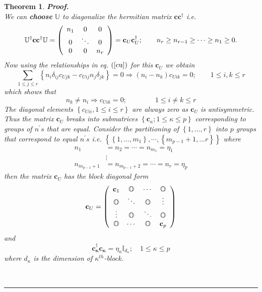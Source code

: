 \documentclass[aps,preprint]{revtex4}%
\newtheorem{theorem}{Theorem}
\newenvironment{proof}[1][Proof]{\noindent\textbf{#1.} }{\ \rule{0.5em}{0.5em}}
\begin{document}
\begin{theorem}
\begin{proof}
\begin{equation}
\end{equation}
We can \textbf{choose} $\mathbb{U}$ to diagonalize the hermitian matrix
$\mathbf{cc}^{\dagger}$ i.e.%
\begin{equation}
\mathbb{U}^{\dagger}\mathbf{cc}\mathbb{^{\dagger}U}=\left(
\begin{array}
[c]{ccc}%
n_{1} & 0 & 0\\
0 & \ddots & 0\\
0 & 0 & n_{r}%
\end{array}
\right)  =\mathbf{c}_{U}\mathbf{c}_{U}^{\dagger};\qquad n_{r}\geq n_{r-1}%
\geq\cdots\geq n_{1}\geq0.
\end{equation}
Now using the relationships in eq. $\left(  \ref{cu}\right)  $ for this
$\mathbf{c}_{U}$ we obtain%
\begin{equation}
\sum_{1\leq j\leq r}\left\{  n_{i}\delta_{ij}c_{Ujk}-c_{Uij}n_{j}\delta
_{jk}\right\}  =0\Rightarrow\left(  n_{i}-n_{k}\right)  c_{Uik}=0;\qquad1\leq
i,k\leq r \label{dub1}%
\end{equation}
which shows that
\begin{equation}
n_{k}\neq n_{i}\Rightarrow c_{Uik}=0;\qquad\qquad1\leq i\neq k\leq r
\end{equation}
The diagonal elements $\left\{  c_{Uii},1\leq i\leq r\right\}  $ are always
zero as $\mathbf{c}_{U}$ is antisymmetric. Thus the matrix $\mathbf{c}_{U}$
breaks into submatrices $\left\{  \mathbf{c}_{\kappa};1\leq\kappa\leq
p\right\}  $ corresponding to groups of $n^{\prime}s$ that are equal. Consider
the partitioning of $\left\{  1,\ldots,r\right\}  $ into $p$ groups that
correspond to equal $n^{\prime}s$ i.e. $\left\{  \left\{  1,\ldots
,m_{1}\right\}  ,\cdots,\left\{  m_{p-1}+1,\ldots r\right\}  \right\}  $
where
\begin{align}
n_{1}  &  =n_{2}=\cdots=n_{m_{1}}=\eta_{1}\nonumber\\
&  \vdots\nonumber\\
n_{m_{p-1}+1}  &  =n_{m_{p-1}+2}=\cdots=n_{r}=\eta_{p}%
\end{align}
then the matrix $\mathbf{c}_{U}$ has the block diagonal form
\begin{equation}
\mathbf{c}_{U}=\left(
\begin{array}
[c]{cccc}%
\mathbf{c}_{1} & \mathbb{O} & \cdots & \mathbb{O}\\
\mathbb{O} & \ddots & \mathbb{O} & \vdots\\
\vdots & \mathbb{O} & \ddots & \mathbb{O}\\
\mathbb{O} & \cdots & \mathbb{O} & \mathbf{c}_{p}%
\end{array}
\right)
\end{equation}
and
\begin{equation}
\mathbf{c_{\kappa}^{\dagger}c_{\kappa}}=\eta_{\kappa}\mathbb{I}_{d_{\kappa}%
};\quad1\leq\kappa\leq p \label{dub2}%
\end{equation}
where $d_{\kappa}$ is the dimension of $\kappa^{th}$-block.


\end{proof}
\end{theorem}
\end{document}
